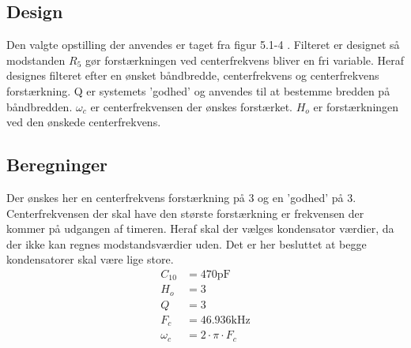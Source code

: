 \subsection{Design}
Den valgte opstilling der anvendes er taget fra figur 5.1-4 \cite[side. 208]{Huelsman1993}.
Filteret er designet så modstanden $R_5$ gør forstærkningen ved centerfrekvens bliver en fri variable.
Heraf designes filteret efter en ønsket båndbredde, centerfrekvens og centerfrekvens forstærkning. Q er systemets 'godhed' og anvendes til at bestemme bredden på båndbredden. 
$\omega_c$ er centerfrekvensen der ønskes forstærket.
$H_o$ er forstærkningen ved den ønskede centerfrekvens.

\subsection{Beregninger}
Der ønskes her en centerfrekvens forstærkning på 3 og en 'godhed' på 3. 
Centerfrekvensen der skal have den største forstærkning er frekvensen der kommer på udgangen af timeren. 
Heraf skal der vælges kondensator værdier, da der ikke kan regnes modstandsværdier uden. 
Det er her besluttet at begge kondensatorer skal være lige store.
\begin{align}
C_{10} & = 470 \si{\pico\farad} \nonumber \\
H_o & = 3 \nonumber \\
Q & = 3 \nonumber \\
F_c & = 46.936 \si{\kilo\hertz} \nonumber \\
\omega_c & = 2 \cdot \pi \cdot F_c
\end{align}

